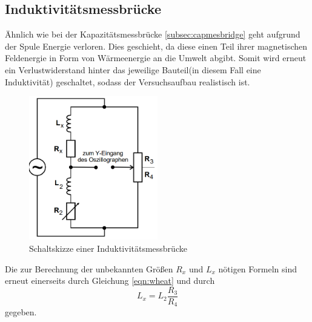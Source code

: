 \subsection{Induktivitätsmessbrücke} \label{subsec:inductance}
Ähnlich wie bei der Kapazitätsmessbrücke \ref{subsec:capmesbridge} geht aufgrund der Spule Energie verloren.
Dies geschieht, da diese einen Teil ihrer magnetischen Feldenergie in Form von Wärmeenergie an die Umwelt abgibt. Somit wird erneut ein Verlustwiderstand 
hinter das jeweilige Bauteil(in diesem Fall eine Induktivität) geschaltet, sodass der Versuchsaufbau realistisch ist.
\begin{figure}
    \centering
    \caption{Schaltskizze einer Induktivitätsmessbrücke}
    \label{fig:inductance}
    \includegraphics[width=0.5\textwidth]{bridges/inductance.png}
\end{figure}
Die zur Berechnung der unbekannten Größen $R_x$ und $L_x$ nötigen Formeln sind erneut einerseits durch Gleichung \eqref{eqn:wheat}
und durch
\begin{equation}
    L_x = L_2 \frac{R_3}{R_4} \label{eqn:inducmes}
\end{equation}
gegeben.
